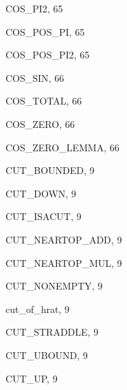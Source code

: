 \begin{theindex}
  \item {\ptt COS\_PI2}, 65
  \item {\ptt COS\_POS\_PI}, 65
  \item {\ptt COS\_POS\_PI2}, 65
  \item {\ptt COS\_SIN}, 66
  \item {\ptt COS\_TOTAL}, 66
  \item {\ptt COS\_ZERO}, 66
  \item {\ptt COS\_ZERO\_LEMMA}, 66
  \item {\ptt CUT\_BOUNDED}, 9
  \item {\ptt CUT\_DOWN}, 9
  \item {\ptt CUT\_ISACUT}, 9
  \item {\ptt CUT\_NEARTOP\_ADD}, 9
  \item {\ptt CUT\_NEARTOP\_MUL}, 9
  \item {\ptt CUT\_NONEMPTY}, 9
  \item {\ptt cut\_of\_hrat}, 9
  \item {\ptt CUT\_STRADDLE}, 9
  \item {\ptt CUT\_UBOUND}, 9
  \item {\ptt CUT\_UP}, 9

  \indexspace


\end{theindex}

